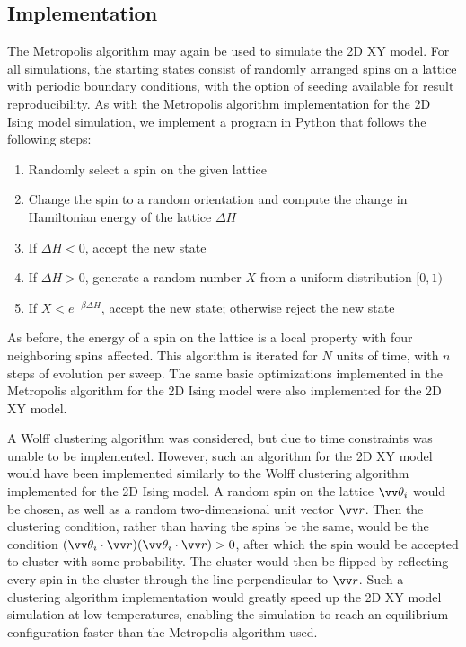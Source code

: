 \documentclass[twocolumn,aps]{revtex4-1} %
\begin{document}
\subsection{Implementation}
The Metropolis algorithm may again be used to simulate the 2D XY model. For all simulations, the starting states consist of randomly arranged spins on a lattice with periodic boundary conditions, with the option of seeding available for result reproducibility. As with the Metropolis algorithm implementation for the 2D Ising model simulation, we implement a program in Python that follows the following steps:
\begin{enumerate}
	\item Randomly select a spin on the given lattice
	\item Change the spin to a random orientation and compute the change in Hamiltonian energy of the lattice $\Delta H$
	\item If $\Delta H < 0$, accept the new state
	\item If $\Delta H > 0$, generate a random number $X$ from a uniform distribution $[0,1)$
	\item If $X < e^{-\beta \Delta H}$, accept the new state; otherwise reject the new state
\end{enumerate}
As before, the energy of a spin on the lattice is a local property with four neighboring spins affected. This algorithm is iterated for $N$ units of time, with $n$ steps of evolution per sweep. The same basic optimizations implemented in the Metropolis algorithm for the 2D Ising model were also implemented for the 2D XY model.

A Wolff clustering algorithm was considered, but due to time constraints was unable to be implemented. However, such an algorithm for the 2D XY model would have been implemented similarly to the Wolff clustering algorithm implemented for the 2D Ising model. A random spin on the lattice $\vv \theta_i$ would be chosen, as well as a random two-dimensional unit vector $\vv r$. Then the clustering condition, rather than having the spins be the same, would be the condition $(\vv \theta_i \cdot \vv r) (\vv \theta_i \cdot \vv r) > 0$, after which the spin would be accepted to cluster with some probability. The cluster would then be flipped by reflecting every spin in the cluster through the line perpendicular to $\vv r$. Such a clustering algorithm implementation would greatly speed up the 2D XY model simulation at low temperatures, enabling the simulation to reach an equilibrium configuration faster than the Metropolis algorithm used. 
\end{document}
